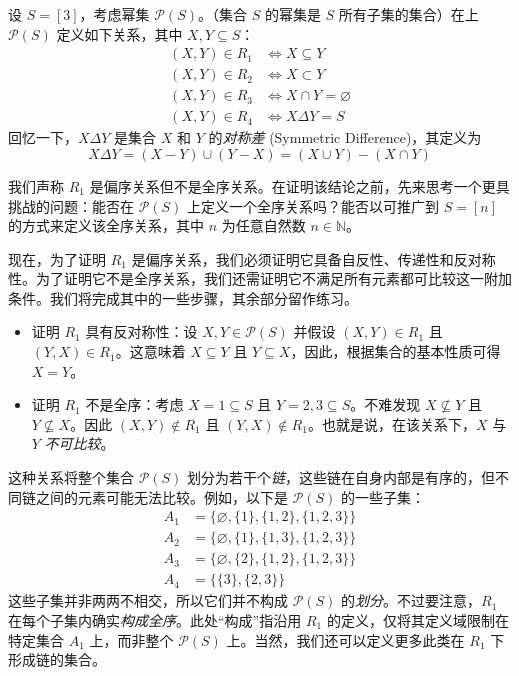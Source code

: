 \begin{example}
    设 $S=[3]$，考虑幂集 $\mathcal{P}(S)$。（集合 $S$ 的幂集是 $S$ 所有子集的集合）在上 $\mathcal{P}(S)$ 定义如下关系，其中 $X, Y \subseteq S$：
    \begin{align*}
        (X, Y) \in R_1 &\iff X \subseteq Y \\
        (X, Y) \in R_2 &\iff X \subset Y \\
        (X, Y) \in R_3 &\iff X \cap Y = \varnothing \\
        (X, Y) \in R_4 &\iff X \Delta Y = S
    \end{align*}
    回忆一下，$X \Delta Y$ 是集合 $X$ 和 $Y$ 的\emph{对称差} (Symmetric Difference)，其定义为
    \[X \Delta Y = (X - Y) \cup (Y - X) = (X \cup Y) - (X \cap Y)\]

    我们声称 $R_1$ 是偏序关系但不是全序关系。在证明该结论之前，先来思考一个更具挑战的问题：能否在 $\mathcal{P}(S)$ 上定义一个全序关系吗？能否以可推广到 $S = [n]$ 的方式来定义该全序关系，其中 $n$ 为任意自然数 $n \in \mathbb{N}$。

    现在，为了证明 $R_1$ 是偏序关系，我们必须证明它具备自反性、传递性和反对称性。为了证明它不是全序关系，我们还需证明它不满足所有元素都可比较这一附加条件。我们将完成其中的一些步骤，其余部分留作练习。

    \begin{itemize}
        \item 证明 $R_1$ 具有反对称性：设 $X, Y \in \mathcal{P}(S)$ 并假设 $(X,Y) \in R_1$ 且 $(Y,X) \in R_1$。这意味着 $X \subseteq Y$ 且 $Y \subseteq X$，因此，根据集合的基本性质可得 $X=Y$。
        \item 证明 $R_1$ 不是全序：考虑 $X = {1} \subseteq S$ 且 $Y = {2, 3} \subseteq S$。不难发现 $X \nsubseteq Y$ 且 $Y \nsubseteq X$。因此 $(X,Y) \notin R_1$ 且 $(Y,X) \notin R_1$。也就是说，在该关系下，$X$ 与 $Y$ \emph{不可比较}。
    \end{itemize}
\end{example}

这种关系将整个集合 $\mathcal{P}(S)$ 划分为若干个\emph{链}，这些链在自身内部是有序的，但不同链之间的元素可能无法比较。例如，以下是 $\mathcal{P}(S)$ 的一些子集：
    \begin{align*}
        A_1 &= \big\{\varnothing, \{1\} , \{1, 2\} , \{1, 2, 3\}\big\} \\
        A_2 &= \big\{\varnothing, \{1\} , \{1, 3\} , \{1, 2, 3\}\big\} \\
	    A_3 &= \big\{\varnothing, \{2\} , \{1, 2\} , \{1, 2, 3\}\big\} \\
        A_4 &= \big\{\{3\} , \{2, 3\}\big\}
    \end{align*}
这些子集并非两两不相交，所以它们并不构成 $\mathcal{P}(S)$ 的\emph{划分}。不过要注意，$R_1$ 在每个子集内确实\emph{构成全序}。此处``构成''指沿用 $R_1$ 的定义，仅将其定义域限制在特定集合 $A_1$ 上，而非整个 $\mathcal{P}(S)$ 上。当然，我们还可以定义更多此类在 $R_1$ 下形成链的集合。

